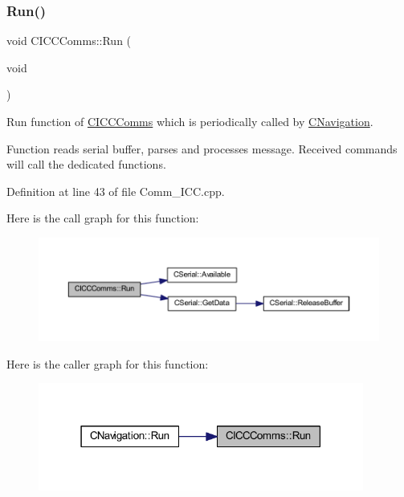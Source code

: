\subsubsection{\texorpdfstring{Run()}{Run()}}
{\footnotesize\ttfamily void C\+I\+C\+C\+Comms\+::\+Run (\begin{DoxyParamCaption}\item[{void}]{ }\end{DoxyParamCaption})\hspace{0.3cm}{\ttfamily [virtual]}}



Run function of \mbox{\hyperlink{class_c_i_c_c_comms}{C\+I\+C\+C\+Comms}} which is periodically called by \mbox{\hyperlink{class_c_navigation}{C\+Navigation}}. 

Function reads serial buffer, parses and processes message. Received commands will call the dedicated functions. 

Definition at line 43 of file Comm\+\_\+\+I\+C\+C.\+cpp.

Here is the call graph for this function\+:
\nopagebreak
\begin{figure}[H]
\begin{center}
\leavevmode
\includegraphics[width=350pt]{class_c_i_c_c_comms_a8b3fa81307b3b9ba0e72b4aee8279c56_cgraph}
\end{center}
\end{figure}
Here is the caller graph for this function\+:
\nopagebreak
\begin{figure}[H]
\begin{center}
\leavevmode
\includegraphics[width=303pt]{class_c_i_c_c_comms_a8b3fa81307b3b9ba0e72b4aee8279c56_icgraph}
\end{center}
\end{figure}


